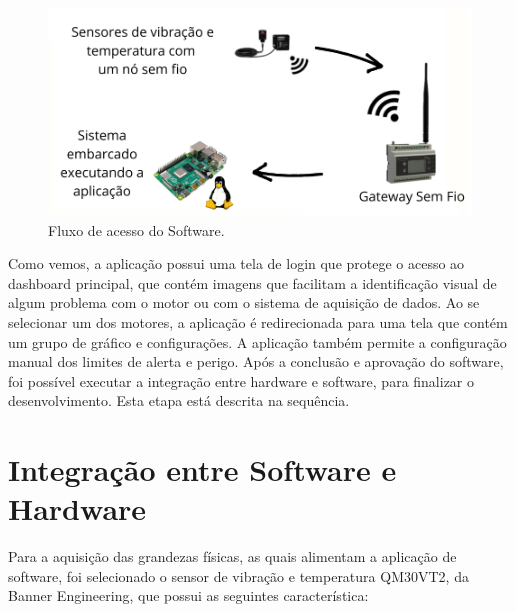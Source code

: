 \begin{figure}[H]
    \caption{Fluxo de acesso do Software.}
    \begin{center}
        \includegraphics[scale=0.8, page=2]{metodologia/img/fluxo_layout.pdf}
    \end{center}
    \label{fig:sensor_exaustor}
\end{figure}

Como vemos, a aplicação possui uma tela de login que protege o acesso ao dashboard principal, que contém imagens que facilitam a identificação
visual de algum problema com o motor ou com o sistema de aquisição de dados. Ao se selecionar um dos motores, a aplicação é redirecionada para
uma tela que contém um grupo de gráfico e configurações. A aplicação também permite a configuração manual dos limites de alerta e perigo.
Após a conclusão e aprovação do software, foi possível executar a integração entre hardware e software, para finalizar o desenvolvimento. Esta
etapa está descrita na sequência.

% 

\section{Integração entre Software e Hardware}

Para a aquisição das grandezas físicas, as quais alimentam a aplicação de software, foi selecionado o sensor de vibração e temperatura QM30VT2, 
da Banner Engineering, que possui as seguintes característica:

